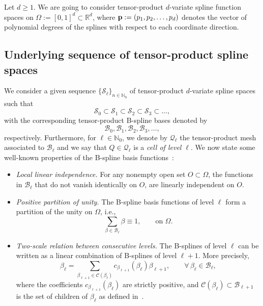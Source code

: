 \documentclass[a4paper]{siamltex1213}
\newcommand\NN{\mathbb N}
\newcommand\BB{\mathcal B}
\newcommand\QQ{\mathcal Q}
\newcommand\VV{\mathcal S}
\newcommand\CC{\mathcal C}
\newcommand{\RR}{\mathbb R}
\begin{document}
Let $d\ge 1$. We are going to consider tensor-product $d$-variate spline function spaces on $\Omega:=[0,1]^d\subset \RR^d$, where ${\bf p}:=(p_1,p_2,\dots,p_d)$ denotes the vector of polynomial degrees of the splines with respect to each coordinate direction.

\subsection{Underlying sequence of tensor-product spline spaces}

We consider a given sequence $\{\VV_\ell\}_{n\in\NN_0}$ of tensor-product $d$-variate spline spaces such that
\begin{equation}\label{E:tensor-product spaces}
 \VV_0\subset \VV_1\subset \VV_2\subset\VV_3\subset\dots,
\end{equation}
with the corresponding tensor-product B-spline bases denoted by
\begin{equation}\label{E:tensor-product basis}
 \BB_0,  \BB_1,  \BB_2, \BB_3,\dots,
\end{equation}
respectively. %
Furthermore, for $\ell\in\NN_0$, we denote by $\QQ_\ell$ the tensor-product mesh associated to $\BB_\ell$ and we say that $Q\in\QQ_\ell$ is a \emph{cell of level $\ell$}. We now state some well-known properties of the B-spline basis functions~\cite{DeBoor,Schumi}:
\begin{itemize}
\item \emph{Local linear independence.} For any nonempty open set $O\subset\Omega$, the functions in $\BB_\ell$ that do not vanish identically on $O$, are linearly independent on $O$.
\item \emph{Positive partition of unity.} The B-spline basis functions of level $\ell$ form a partition of the unity 
on $\Omega$, i.e.,
 \begin{equation}\label{E:partition of unity in B_0}
  \sum_{\beta\in\BB_\ell} \beta \equiv 1,\qquad\text{on }\Omega.
 \end{equation}
\item \emph{Two-scale relation between consecutive levels.} The B-splines of level $\ell$ can be written as a linear combination of B-splines of level $\ell+1$. More precisely, 
\begin{equation}\label{E:two scale relation}
 \beta_\ell = \sum_{\beta_{\ell+1}\in\CC(\beta_{\ell})} 
c_{\beta_{\ell+1}}(\beta_\ell)\beta_{\ell+1}, 
\qquad \forall\,\beta_\ell\in\BB_\ell,
\end{equation}
where the coefficients $c_{\beta_{\ell+1}}(\beta_\ell)$ are strictly positive, and $\CC(\beta_\ell)\subset\BB_{\ell+1}$ is the set of children of $\beta_\ell$ as defined in~\cite{BG15}. 
\end{itemize}
\end{document}
